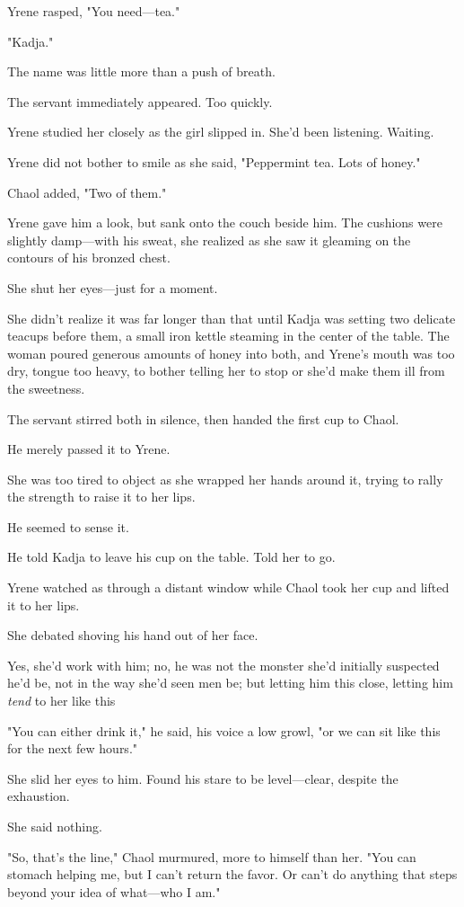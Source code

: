Yrene rasped, "You need---tea."

"Kadja."

The name was little more than a push of breath.

The servant immediately appeared.
Too quickly.

Yrene studied her closely as the girl slipped in.
She'd been listening.
Waiting.

Yrene did not bother to smile as she said, "Peppermint tea.
Lots of honey."

Chaol added, "Two of them."

Yrene gave him a look, but sank onto the couch beside him.
The cushions were slightly damp---with his sweat, she realized as she saw it gleaming on the contours of his bronzed chest.

She shut her eyes---just for a moment.

She didn't realize it was far longer than that until Kadja was setting two delicate teacups before them, a small iron kettle steaming in the center of the table.
The woman poured generous amounts of honey into both, and Yrene's mouth was too dry, tongue too heavy, to bother telling her to stop or she'd make them ill from the sweetness.

The servant stirred both in silence, then handed the first cup to Chaol.

He merely passed it to Yrene.

She was too tired to object as she wrapped her hands around it, trying to rally the strength to raise it to her lips.

He seemed to sense it.

He told Kadja to leave his cup on the table.
Told her to go.

Yrene watched as through a distant window while Chaol took her cup and lifted it to her lips.

She debated shoving his hand out of her face.

Yes, she'd work with him; no, he was not the monster she'd initially suspected he'd be, not in the way she'd seen men be; but letting him this close, letting him \emph{tend} to her like this 

"You can either drink it," he said, his voice a low growl, "or we can sit like this for the next few hours."

She slid her eyes to him.
Found his stare to be level---clear, despite the exhaustion.

She said nothing.

"So, that's the line," Chaol murmured, more to himself than her.
"You can stomach helping me, but I can't return the favor.
Or can't do anything that steps beyond your idea of what---who I am."

